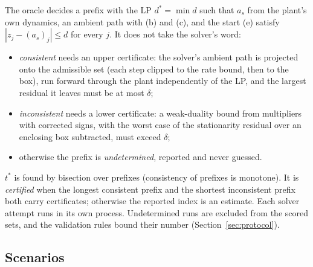 \documentclass[11pt,a4paper]{article}
\newcommand{\tstar}{t^{\ast}}
\begin{document}
The oracle decides a prefix with the LP $d^\ast = \min d$ such that $a_s$ from the plant's own dynamics, an ambient
path with (b) and (c), and the start (e) satisfy $|z_j - (a_s)_j|\le d$ for every $j$. It does not take the solver's
word:
\begin{itemize}
\item \emph{consistent} needs an upper certificate: the solver's ambient path is projected onto the admissible set
  (each step clipped to the rate bound, then to the box), run forward through the plant independently of the LP, and
  the largest residual it leaves must be at most $\delta$;
\item \emph{inconsistent} needs a lower certificate: a weak-duality bound from multipliers with corrected signs, with
  the worst case of the stationarity residual over an enclosing box subtracted, must exceed $\delta$;
\item otherwise the prefix is \emph{undetermined}, reported and never guessed.
\end{itemize}
$\tstar$ is found by bisection over prefixes (consistency of prefixes is monotone). It is \emph{certified} when the
longest consistent prefix and the shortest inconsistent prefix both carry certificates; otherwise the reported index is
an estimate. Each solver attempt runs in its own process. Undetermined runs are excluded
from the scored sets, and the validation rules bound their number (Section~\ref{sec:protocol}).

\subsection{Scenarios}
\end{document}
